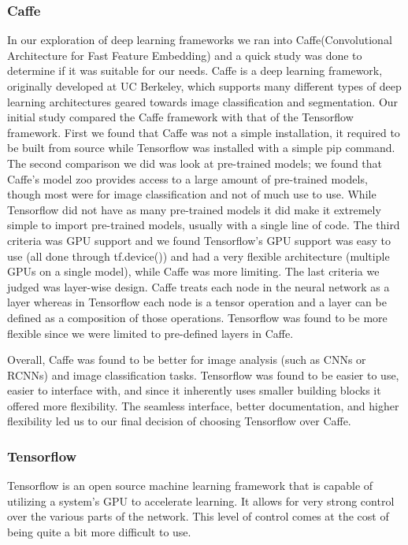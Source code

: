 \documentclass{article}
\begin{document}
\subsubsection{Caffe}

In our exploration of deep learning frameworks we ran into Caffe(Convolutional Architecture for Fast Feature Embedding)  \cite{jia2014caffe} and a quick study was done to determine if it was suitable for our needs. Caffe is a deep learning framework, originally developed at UC Berkeley, which supports many different types of deep learning architectures geared towards image classification and segmentation. Our initial study compared the Caffe framework with that of the Tensorflow framework. First we found that Caffe was not a simple installation, it required to be built from source while Tensorflow was installed with a simple pip command. The second comparison we did was look at pre-trained models; we found that Caffe's model zoo provides access to a large amount of pre-trained models, though most were for image classification and not of much use to use. While Tensorflow did not have as many pre-trained models it did make it extremely simple to import pre-trained models, usually with a single line of code. The third criteria was GPU support and we found Tensorflow's GPU support was easy to use (all done through tf.device()) and had a very flexible architecture (multiple GPUs on a single model), while Caffe was more limiting. The last criteria we judged was layer-wise design. Caffe treats each node in the neural network as a layer whereas in Tensorflow each node is a tensor operation and a layer can be defined as a composition of those operations. Tensorflow was found to be more flexible since we were limited to pre-defined layers in Caffe.

Overall, Caffe was found to be better for image analysis (such as CNNs or RCNNs) and image classification tasks. Tensorflow was found to be easier to use, easier to interface with, and since it inherently uses smaller building blocks it offered more flexibility. The seamless interface, better documentation, and higher flexibility led us to our final decision of choosing Tensorflow over Caffe.



\subsubsection{Tensorflow}

Tensorflow is an open source machine learning framework that is capable of utilizing a system's GPU to accelerate learning. It allows for very strong control over the various parts of the network. This level of control comes at the cost of being quite a bit more difficult to use. 
\end{document}
